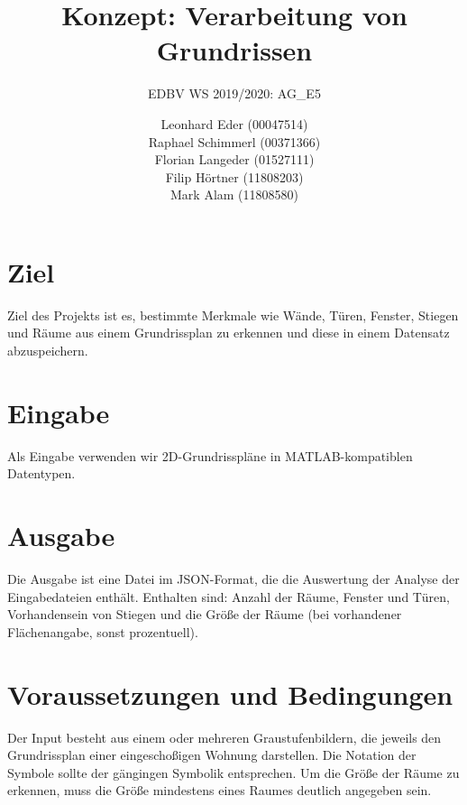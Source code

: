 \documentclass[deutsch]{scrartcl}
\begin{document}
\title{Konzept: Verarbeitung von Grundrissen} %

\subtitle{EDBV WS 2019/2020: AG\_E5} %


\author{Leonhard Eder (00047514)\\
Raphael Schimmerl (00371366)\\
Florian Langeder (01527111)\\
Filip Hörtner (11808203)\\
Mark Alam (11808580)}


\maketitle



\section{Ziel}
Ziel des Projekts ist es, bestimmte Merkmale wie Wände, Türen, Fenster, Stiegen und Räume aus einem Grundrissplan zu erkennen und diese in einem Datensatz abzuspeichern.
\section{Eingabe}
Als Eingabe verwenden wir 2D-Grundrisspläne in MATLAB-kompatiblen Datentypen.
\section{Ausgabe}
Die Ausgabe ist eine Datei im JSON-Format, die die Auswertung der Analyse der Eingabedateien enthält. Enthalten sind: Anzahl der Räume, Fenster und Türen, Vorhandensein von Stiegen und die Größe der Räume (bei vorhandener Flächenangabe, sonst prozentuell).
\section{Voraussetzungen und Bedingungen}
Der Input besteht aus einem oder mehreren Graustufenbildern, die jeweils den Grundrissplan einer eingeschoßigen Wohnung darstellen. Die Notation der Symbole sollte der gängingen Symbolik entsprechen. Um die Größe der Räume zu erkennen, muss die Größe mindestens eines Raumes deutlich angegeben sein.
\end{document}
